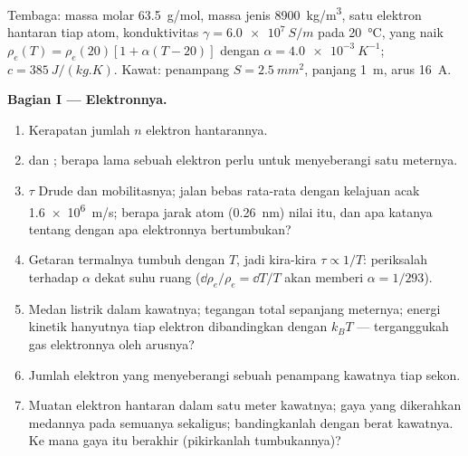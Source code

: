 \begin{problem}
\label{pb:b2:charges-currents-conduction:1}

Tembaga: massa molar \qty{63.5}{g/mol}, massa jenis \qty{8900}{kg/m^3}, satu
elektron hantaran tiap atom, konduktivitas $\gamma = \qty{6.0e7}{S/m}$ pada
\qty{20}{\degreeCelsius},  yang naik $\rho_e(T) = \rho_e(20)[1 +
\alpha(T - 20)]$ dengan $\alpha = \qty{4.0e-3}{K^{-1}}$; $c = \qty{385}{J/(kg.K)}$. Kawat:
penampang $S = \qty{2.5}{mm^2}$, panjang \qty{1}{m}, arus \qty{16}{A}.

\medskip
\noindent\textbf{Bagian I --- Elektronnya.}
\begin{enumerate}
  \item Kerapatan jumlah $n$ elektron hantarannya.
  \item {} dan ; berapa lama sebuah elektron
        perlu untuk menyeberangi satu meternya.
  \item $\tau$ Drude dan mobilitasnya; jalan bebas rata-rata dengan kelajuan
        acak \qty{1.6e6}{m/s}; berapa jarak atom (\qty{0.26}{nm})
        nilai itu, dan apa katanya tentang dengan apa elektronnya
        bertumbukan?
  \item Getaran termalnya tumbuh dengan $T$, jadi kira-kira $\tau \propto 1/T$:
        periksalah terhadap $\alpha$ dekat suhu ruang ($\dd\rho_e/\rho_e =
        \dd T/T$ akan memberi $\alpha = 1/293$).
  \item Medan listrik dalam kawatnya; tegangan total sepanjang meternya;
        energi kinetik hanyutnya tiap elektron dibandingkan dengan $k_BT$ ---
        terganggukah gas elektronnya oleh arusnya?
  \item Jumlah elektron yang menyeberangi sebuah penampang kawatnya tiap sekon.
  \item Muatan elektron hantaran dalam satu meter kawatnya; gaya
        yang dikerahkan medannya pada semuanya sekaligus; bandingkanlah dengan
        berat kawatnya. Ke mana gaya itu berakhir (pikirkanlah
        tumbukannya)?
\end{enumerate}


\end{problem}
